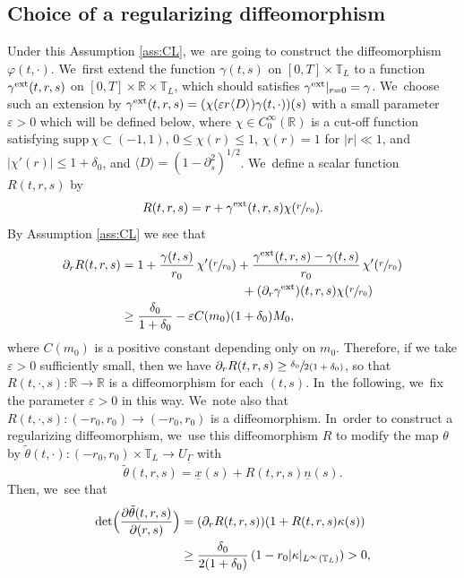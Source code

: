 \documentclass[10pt]{amsart}
\newcommand{\R}{{\mathbb R}}
\newcommand{\ul}[1]{\underline{#1}}
\newcommand{\itGamma}{\mathit{\Gamma}}
\theoremstyle{definition}
\begin{document}
\subsection{Choice of a regularizing diffeomorphism}\label{subsect:ChoiceD}
Under this Assumption \ref{ass:CL}, we~are going to construct the diffeomorphism $\varphi(t,\cdot)$. We~first extend the function $\gamma(t,s)$ on $[0,T]\times\mathbb{T}_L$ to a function $\gamma^{\rm ext}(t,r,s)$ on $[0,T]\times\R\times\mathbb{T}_L$,
which should satisfies $\gamma^{\rm ext}|_{r=0}=\gamma$. We~choose such an extension by $\gamma^{\rm ext}(t,r,s)=(\chi(\varepsilon r\langle D\rangle)\gamma(t,\cdot))(s)$ with a small parameter $\varepsilon>0$
which will be defined below, where $\chi \in C_0^\infty(\R)$ is a cut-off function satisfying $\mbox{supp}\,\chi \subset (-1,1)$,
$0\leq \chi(r)\leq 1$, $\chi(r)=1$ for $|r|\ll1$, and $|\chi'(r)| \leq 1+\delta_0$, and $\langle D\rangle=(1-\partial_s^2)^{1/2}$. We~define a scalar function $R(t,r,s)$ by
\[
R(t,r,s) = r + \gamma^{\rm ext}(t,r,s)\chi(\sfrac{r}{r_0}).
\]
By Assumption \ref{ass:CL} we see that
\begin{align*}
\partial_r R(t,r,s)
&= 1 + \frac{\gamma(t,s)}{r_0}\,\chi'(\sfrac{r}{r_0}) + \frac{\gamma^{\rm ext}(t,r,s)-\gamma(t,s)}{r_0}\,\chi'(\sfrac{r}{r_0})\\
&\hspace*{3.4cm}+ (\partial_r\gamma^{\rm ext})(t,r,s)\chi(\sfrac{r}{r_0}) \\
&\geq \frac{\delta_0}{1+\delta_0} - \varepsilon C(m_0)(1+\delta_0)M_0,
\end{align*}
where $C(m_0)$ is a positive constant depending only on $m_0$.
Therefore, if we take $\varepsilon>0$ sufficiently small, then we have $\partial_r R(t,r,s) \geq \sfrac{\delta_0}{2(1+\delta_0)}$,
so that $R(t,\cdot,s): \R\to\R$ is a diffeomorphism for each $(t,s)$. In~the following, we~fix the parameter $\varepsilon>0$ in this way. We~note also that $R(t,\cdot,s): (-r_0,r_0) \to (-r_0,r_0)$ is a diffeomorphism. In~order to construct a regularizing diffeomorphism, we~use this diffeomorphism $R$ to modify the map $\theta$ by
$\tilde{\theta}(t,\cdot): (-r_0,r_0)\times\mathbb{T}_L \to U_{\ul{\itGamma}}$ with
\begin{equation}\label{theta-modify}
\tilde{\theta}(t,r,s) = \ul{x}(s) + R(t,r,s)\ul{n}(s).
\end{equation}
Then, we~see that
\begin{align*}
\det\Bigl(\frac{\partial\tilde{\theta}(t,r,s)}{\partial(r,s)} \Bigr)
&= (\partial_rR(t,r,s))(1+R(t,r,s)\kappa(s)) \\
&\geq \frac{\delta_0}{2(1+\delta_0)}\,(1-r_0|\kappa|_{L^\infty(\mathbb{T}_L)})>0,
\end{align*}
\end{document}
